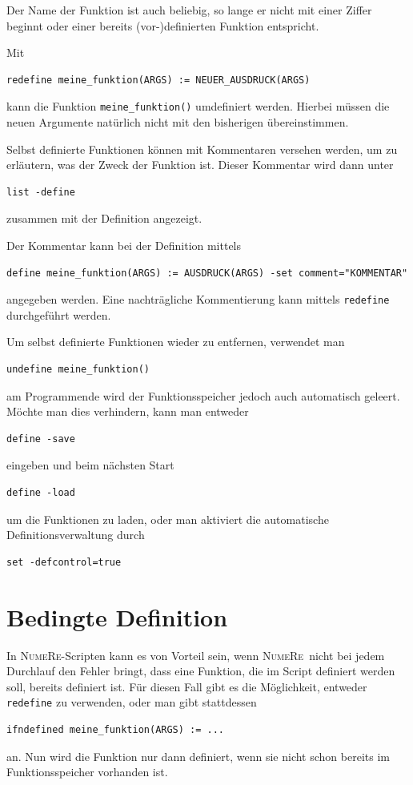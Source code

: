 \documentclass[DIV=14,headsepline,footsepline]{scrbook}
\newcommand{\NR}{\textsc{Nu\-me\-Re}}
\begin{document}
				Der Name der Funktion ist auch beliebig, so lange er nicht mit einer Ziffer beginnt oder einer bereits (vor-)definierten Funktion entspricht.
				
				Mit
				\begin{lstlisting}
redefine meine_funktion(ARGS) := NEUER_AUSDRUCK(ARGS)
				\end{lstlisting}
				kann die Funktion \lstinline+meine_funktion()+ umdefiniert werden. Hierbei müssen die neuen Argumente natürlich nicht mit den bisherigen übereinstimmen.
				
				Selbst definierte Funktionen können mit Kommentaren versehen werden, um zu erläutern, was der Zweck der Funktion ist. Dieser Kommentar wird dann unter
				\begin{lstlisting}
list -define
				\end{lstlisting}
				zusammen mit der Definition angezeigt.
				
				Der Kommentar kann bei der Definition mittels
				\begin{lstlisting}
define meine_funktion(ARGS) := AUSDRUCK(ARGS) -set comment="KOMMENTAR"
				\end{lstlisting}
				angegeben werden. Eine nachträgliche Kommentierung kann mittels \lstinline+redefine+ durchgeführt werden.
				
				Um selbst definierte Funktionen wieder zu entfernen, verwendet man
				\begin{lstlisting}
undefine meine_funktion()
				\end{lstlisting}
				am Programmende wird der Funktionsspeicher jedoch auch automatisch geleert. Möchte man dies verhindern, kann man entweder
				\begin{lstlisting}
define -save
				\end{lstlisting}
				eingeben und beim nächsten Start
				\begin{lstlisting}
define -load
				\end{lstlisting}
				um die Funktionen zu laden, oder man aktiviert die automatische Definitionsverwaltung durch
				\begin{lstlisting}
set -defcontrol=true
				\end{lstlisting}
				
			\section{Bedingte Definition}
				In \NR-Scripten kann es von Vorteil sein, wenn \NR\ nicht bei jedem Durchlauf den Fehler bringt, dass eine Funktion, die im Script definiert werden soll, bereits definiert ist. Für diesen Fall gibt es die Möglichkeit, entweder \lstinline+redefine+ zu verwenden, oder man gibt stattdessen
				\begin{lstlisting}
ifndefined meine_funktion(ARGS) := ...
				\end{lstlisting}
				an. Nun wird die Funktion nur dann definiert, wenn sie nicht schon bereits im Funktionsspeicher vorhanden ist.
\end{document}
